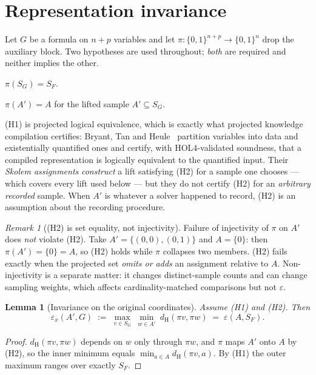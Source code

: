 \documentclass[11pt,a4paper]{article}
\theoremstyle{plain}
\newtheorem{lemma}[theorem]{Lemma}
\theoremstyle{definition}
\theoremstyle{remark}
\newtheorem{remark}[theorem]{Remark}
\newcommand{\dH}{d_{\mathrm{H}}}
\newcommand{\SF}{S_F}
\begin{document}
\section{Representation invariance}\label{sec:invariance}

Let $G$ be a formula on $n+p$ variables and let
$\pi : \{0,1\}^{n+p} \to \{0,1\}^n$ drop the auxiliary block. Two hypotheses are
used throughout; \emph{both} are required and neither implies the other.

\begin{description}[nosep]
\item[(H1) the solution set projects:] $\pi(S_G) = \SF$.
\item[(H2) the recorded sample projects:] $\pi(A') = A$ for the lifted sample
      $A' \subseteq S_G$.
\end{description}

(H1) is projected logical equivalence, which is exactly what projected knowledge
compilation certifies: Bryant, Tan and Heule~\cite{bryant2025certifying} partition
variables into data and existentially quantified ones and certify, with
HOL4-validated soundness, that a compiled representation is logically equivalent
to the quantified input. Their \emph{Skolem assignments} \emph{construct} a lift
satisfying (H2) for a sample one chooses --- which covers every lift used below
--- but they do not certify (H2) for an \emph{arbitrary recorded} sample. When
$A'$ is whatever a solver happened to record, (H2) is an assumption about the
recording procedure.

\begin{remark}[(H2) is set equality, not injectivity]\label{rem:inj}
Failure of injectivity of $\pi$ on $A'$ does \emph{not} violate (H2). Take
$A' = \{(0,0),(0,1)\}$ and $A = \{0\}$: then $\pi(A') = \{0\} = A$, so (H2)
holds while $\pi$ collapses two members. (H2) fails exactly when the projected
set \emph{omits or adds} an assignment relative to $A$. Non-injectivity is a
separate matter: it changes distinct-sample counts and can change sampling
weights, which affects cardinality-matched comparisons but not $\varepsilon$.
\end{remark}

\begin{lemma}[Invariance on the original coordinates]\label{lem:inv}
Assume \textup{(H1)} and \textup{(H2)}. Then
\[
  \varepsilon_x(A',G) \;:=\;
  \max_{v \in S_G}\ \min_{w \in A'}\ \dH(\pi v, \pi w)
  \;=\; \varepsilon(A,\SF).
\]
\end{lemma}
\begin{proof}
$\dH(\pi v, \pi w)$ depends on $w$ only through $\pi w$, and $\pi$ maps $A'$
onto $A$ by (H2), so the inner minimum equals
$\min_{a \in A}\dH(\pi v, a)$. By (H1) the outer maximum ranges over exactly
$\SF$.
\end{proof}
\end{document}
